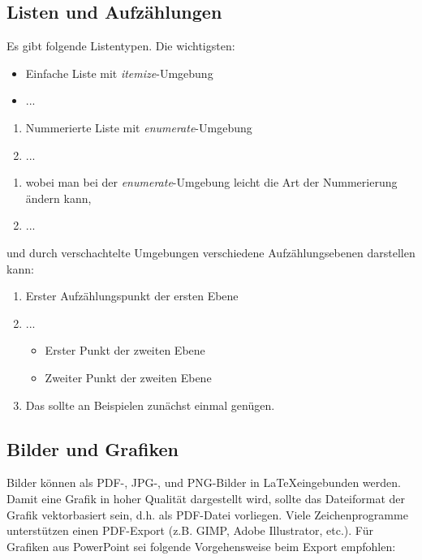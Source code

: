 \subsection{Listen und Aufzählungen}

Es gibt folgende Listentypen. Die wichtigsten:

\begin{itemize}
	\item Einfache Liste mit \textit{itemize}-Umgebung
	\item ...
\end{itemize}

\begin{enumerate}
	\item Nummerierte Liste mit \textit{enumerate}-Umgebung
	\item ...
\end{enumerate}

\begin{enumerate}[label=\alph*.]
	\item wobei man bei der \textit{enumerate}-Umgebung leicht die Art der Nummerierung ändern kann,
	\item ...
\end{enumerate}

und durch verschachtelte Umgebungen verschiedene Aufzählungsebenen darstellen kann:

\begin{enumerate}[label=\alph*)]
	\item Erster Aufzählungspunkt der ersten Ebene
	\item ...
	\begin{itemize}
		\item Erster Punkt der zweiten Ebene
		\item Zweiter Punkt der zweiten Ebene
	\end{itemize}
	\item Das sollte an Beispielen zunächst einmal genügen.
\end{enumerate}

\clearpage

\subsection{Bilder und Grafiken}

Bilder können als PDF-, JPG-, und PNG-Bilder in \LaTeX eingebunden werden. Damit eine Grafik in hoher Qualität dargestellt wird, sollte das Dateiformat der Grafik vektorbasiert sein, d.h. als PDF-Datei vorliegen. Viele Zeichenprogramme unterstützen einen PDF-Export (z.B. GIMP, Adobe Illustrator, etc.). Für Grafiken aus PowerPoint sei folgende Vorgehensweise beim Export empfohlen:

